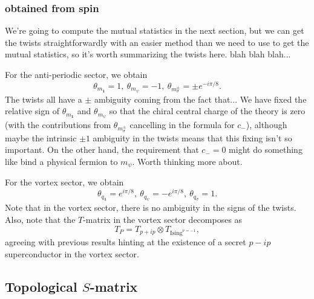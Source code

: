 \documentclass[12pt,a4paper]{article}
\newcommand{\tp}{\otimes}
\newcommand{\unit}{\mathbf{1}}
\newcommand\be            {\begin{equation}}
\newcommand\ee            {\end{equation}}
\begin{document}
\subsubsection{obtained from spin}
We're going to compute the mutual statistics in the next section, but we can get the twists straightforwardly with an easier method than we need to use to get the mutual statistics, so it's worth summarizing the twists here. blah blah blah...

For the anti-periodic sector, we obtain 
\be \theta_{m_\unit} = 1,\ \theta_{m_\psi} = -1,\ \theta_{m^\pm_\sigma} = \pm e^{-i\pi/8}.\ee
The twists all have a $\pm$ ambiguity coming from the fact that...
We have fixed the relative sign of $\theta_{m_\unit}$ and $\theta_{m_\psi}$ so that the chiral central charge of the theory is zero (with the contributions from $\theta_{m_\sigma^\pm}$ cancelling in the formula for $c_-$), although maybe the intrinsic $\pm1$ ambiguity in the twists means that this fixing isn't so important. On the other hand, the requirement that $c_-=0$ might do something like bind a physical fermion to $m_\psi$. Worth thinking more about. 

For the vortex sector, we obtain 
\be \theta_{q_\unit} = e^{i\pi/8},\ \theta_{q_\psi} = -e^{i\pi/8},\ \theta_{q_\sigma} = 1.\ee
Note that in the vortex sector, there is no ambiguity in the signs of the twists. Also, note that the $T$-matrix in the vortex sector decomposes as 
\be T_P = T_{p+ip} \tp T_{\text{Ising}^{\nu = -1}},\ee
agreeing with previous results hinting at the existence of a secret $p-ip$ superconductor in the vortex sector. 



\subsection{Topological $S$-matrix}
\end{document}
